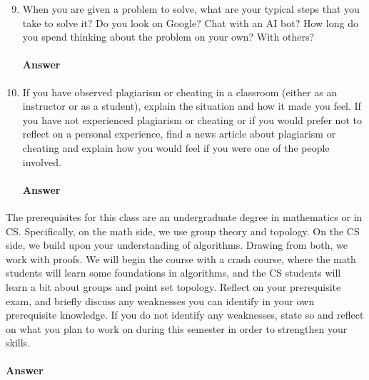 \documentclass{article}
\begin{document}

\begin{enumerate}
    \setcounter{enumi}{8}
    \item When you are given a problem to solve, what are your typical steps
        that you take to solve it?   Do you look on Google? Chat with an AI bot?
        How long do you spend thinking about the problem on your own? With
        others?
        \paragraph{Answer}
        \todo{}



    \item If you have observed plagiarism or cheating in a classroom (either as
        an instructor or as a student), explain the situation and how it made
        you feel.  If you have not experienced plagiarism or cheating or if you
        would prefer not to reflect on a personal experience, find a news
        article about plagiarism or cheating and explain how you would feel if
        you were one of the people involved.

        \paragraph{Answer}
        \todo{}
\end{enumerate}



The prerequisites for this class are an undergraduate degree in mathematics or
in CS.  Specifically, on the math side, we use group theory and topology. On the
CS side, we build upon your understanding of algorithms. Drawing from both, we
work with proofs.
We will begin the course with a crash course, where the math students will learn
some foundations in algorithms, and the CS students will learn a bit about
groups and point set topology.
Reflect on your prerequisite exam, and briefly discuss any
weaknesses you can identify in your own prerequisite knowledge. If you do not
identify any weaknesses, state so and reflect on what you plan to work on during
this semester in order to strengthen your skills.

\paragraph{Answer}

\todo{}
\end{document}
